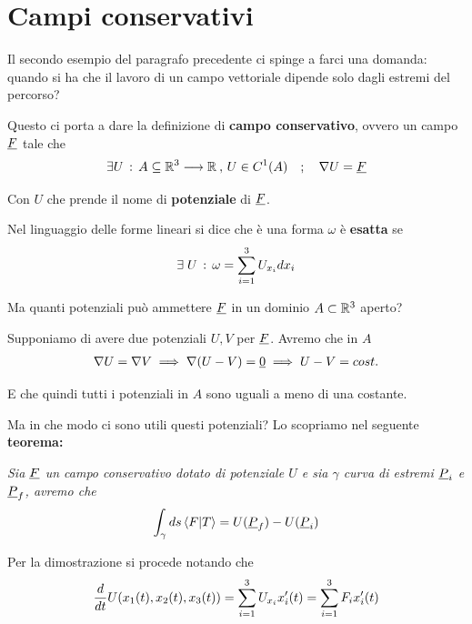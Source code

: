 \newpage

\section{Campi conservativi}

Il secondo esempio del paragrafo precedente ci spinge a farci una domanda: quando si ha che il lavoro di un campo vettoriale dipende solo dagli estremi del percorso?

Questo ci porta a dare la definizione di \textbf{campo conservativo}, ovvero un campo $\underline{F}$ tale che
\begin{align}
	\exists U \, : \, A\subseteq \mathbb{R}^{3} \longrightarrow \mathbb{R}^{} \, , \, U\in C^1(A) \quad ; \quad \nabla U = \underline{F}
\end{align}

Con $U$ che prende il nome di \textbf{potenziale} di $\underline{F}$.

Nel linguaggio delle forme lineari si dice che è una forma $\omega$ è \textbf{esatta} se
\begin{align}
	\exists \; U \, : \, \omega = \sum_{i=1}^{3} U_{x_i} dx_i
\end{align}

Ma quanti potenziali può ammettere $\underline{F}$ in un dominio $A\subset \mathbb{R}^3$ aperto?
\bigskip

Supponiamo di avere due potenziali $U,V$ per $\underline{F}$. Avremo che in $A$
\begin{align}
	\nabla U = \nabla V \implies \nabla (U-V)=\underline{0} \implies U-V = cost.
\end{align}

E che quindi tutti i potenziali in $A$ sono uguali a meno di una costante.

Ma in che modo ci sono utili questi potenziali? Lo scopriamo nel seguente \textbf{teorema:}

\bigskip

\textit{Sia $\underline{F}$ un campo conservativo dotato di potenziale $U$ e sia $\gamma$ curva di estremi $\underline{P}_i$ e $\underline{P}_f$, avremo che}
\begin{align}
	\int_{\gamma} ds \braket{F|T}= U(\underline{P}_f) - U(\underline{P}_i)
\end{align} 

\bigskip

Per la dimostrazione si procede notando che
\begin{align}
	\frac{d }{d t}U(x_1(t) , x_2(t) , x_3(t)) = \sum_{i=1}^{3} U_{x_i} x'_i(t)= \sum_{i=1}^{3} F_i x'_i(t)
\end{align}

